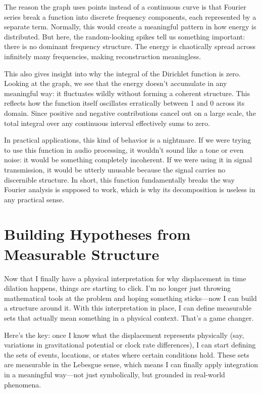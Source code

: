\documentclass{article}
\begin{document}
The reason the graph uses points instead of a continuous curve is that Fourier series break a function into discrete frequency components, each represented by a separate term. Normally, this would create a meaningful pattern in how energy is distributed. But here, the random-looking spikes tell us something important: there is no dominant frequency structure. The energy is chaotically spread across infinitely many frequencies, making reconstruction meaningless.

This also gives insight into why the integral of the Dirichlet function is zero. Looking at the graph, we see that the energy doesn’t accumulate in any meaningful way: it fluctuates wildly without forming a coherent structure. This reflects how the function itself oscillates erratically between 1 and 0 across its domain. Since positive and negative contributions cancel out on a large scale, the total integral over any continuous interval effectively sums to zero.

In practical applications, this kind of behavior is a nightmare. If we were trying to use this function in audio processing, it wouldn’t sound like a tone or even noise: it would be something completely incoherent. If we were using it in signal transmission, it would be utterly unusable because the signal carries no discernible structure. In short, this function fundamentally breaks the way Fourier analysis is supposed to work, which is why its decomposition is useless in any practical sense.

\section{Building Hypotheses from Measurable Structure}

Now that I finally have a physical interpretation for why displacement in time dilation happens, things are starting to click. I’m no longer just throwing mathematical tools at the problem and hoping something sticks—now I can build a structure around it. With this interpretation in place, I can define measurable sets that actually mean something in a physical context. That’s a game changer.

Here’s the key: once I know what the displacement represents physically (say, variations in gravitational potential or clock rate differences), I can start defining the sets of events, locations, or states where certain conditions hold. These sets are measurable in the Lebesgue sense, which means I can finally apply integration in a meaningful way—not just symbolically, but grounded in real-world phenomena.
\end{document}
